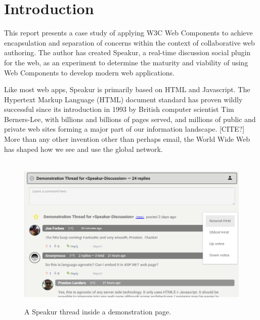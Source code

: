 \chapter{Introduction}
%

%
%

This report presents a case study of applying W3C Web Components 
to achieve encapsulation and separation of concerns within the context of collaborative web authoring. 
The author has created Speakur, a real-time discussion social plugin for the web, 
as an experiment to determine the maturity and viability of using Web Components to develop modern web applications.

Like most web apps, Speakur is primarily based on HTML and Javascript. 
The Hypertext Markup Language (HTML) 
document standard has proven wildly successful since its introduction in 1993 by British computer scientist 
Tim Berners-Lee, 
with billions and billions of pages served, 
and millions of public and private web sites forming a major part of our information landscape. [CITE?]
More than any other invention other than perhaps email, the World Wide Web has shaped how we see and use the global network.

% 
\begin{figure}[htb]
\begin{center}
\ \includegraphics[width=6in]{images/screenshot_20150312_1630_v2.png}
\caption{A Speakur thread inside a demonstration page.}
\label{f:ex}
\end{center}
\end{figure}
%

